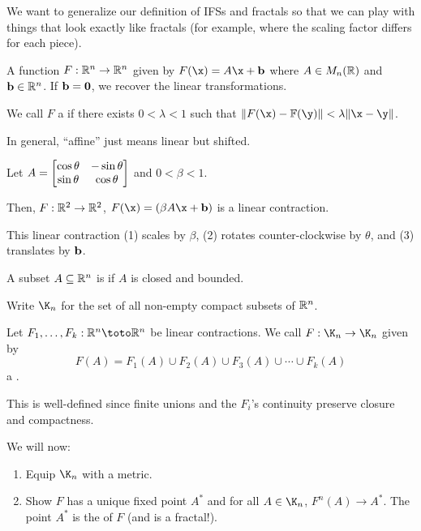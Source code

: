 \documentclass[class=pmath370,tikz,notes]{agony}
\begin{document}
We want to generalize our definition of IFSs and fractals
so that we can play with things that look exactly like fractals
(for example, where the scaling factor differs for each piece).

\begin{defn}
  A function $F : \mathbb{R}^n \to \mathbb{R}^n$ given by $F(\x) = A\x + \vb b$
  where $A \in M_n(\mathbb{R})$ and $\vb b \in \mathbb{R}^n$.
  If $\vb b = \vb 0$, we recover the linear transformations.

  We call $F$ a  if there exists $0 < \lambda < 1$
  such that $\norm{F(\x) - \F(\y)} < \lambda\norm{\x - \y}$.
\end{defn}

In general, ``affine'' just means linear but shifted.

\begin{example}
  Let $A = \mqty[\cos\theta & -\sin\theta \\ \sin\theta & \cos\theta]$ and $0 < \beta < 1$.

  Then, $F : \mathbb{R}^2 \to \mathbb{R}^2$, $F(\x) = (\beta A\x + \vb b)$ is a linear contraction.
\end{example}

This linear contraction (1) scales by $\beta$,
(2) rotates counter-clockwise by $\theta$,
and (3) translates by $\vb b$.

\begin{defn}[compactness]
  A subset $A \subseteq \mathbb{R}^n$ is  if $A$ is closed and bounded.

  Write $\K_n$ for the set of all non-empty compact subsets of $\mathbb{R}^n$.
\end{defn}

\begin{defn}
  Let $F_1,\dotsc,F_k : \R^n \toto \R^n$ be linear contractions.
  We call $F : \K_n \to \K_n$ given by
  \[ F(A) = F_1(A) \cup F_2(A) \cup F_3(A) \cup \dotsb \cup F_k(A) \]
  a .
\end{defn}

This is well-defined since finite unions and the $F_i$'s continuity
preserve closure and compactness.

We will now:
\begin{enumerate}[nosep]
  \item Equip $\K_n$ with a metric.
  \item Show $F$ has a unique fixed point $A^*$ and for all $A \in \K_n$, $F^n(A) \to A^*$.
        The point $A^*$ is the  of $F$ (and is a fractal!).
\end{enumerate}
\end{document}
